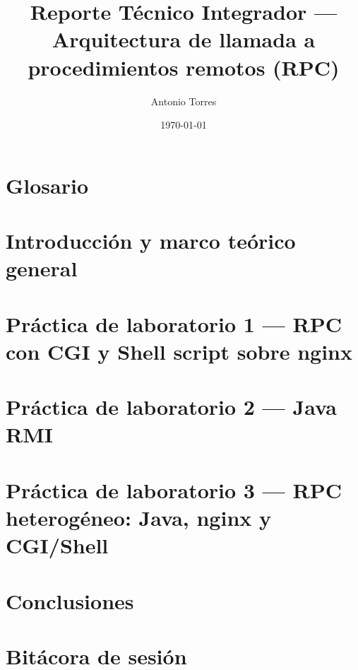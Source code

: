 \documentclass[12pt,letterpaper,oneside]{report}
\title{Reporte Técnico Integrador --- Arquitectura de llamada a procedimientos remotos (RPC)}
\author{Antonio Torres}
\date{\today}
\begin{document}


\clearpage

\tableofcontents
\clearpage
\listoffigures
\clearpage

\chapter*{Glosario}

\clearpage


\chapter{Introducción y marco teórico general}


\chapter{Práctica de laboratorio 1 --- RPC con CGI y Shell script sobre nginx}
\label{ch:practica1}




\chapter{Práctica de laboratorio 2 --- Java RMI}
\label{ch:practica2}




\chapter{Práctica de laboratorio 3 --- RPC heterogéneo: Java, nginx y CGI/Shell}
\label{ch:practica3}




\chapter{Conclusiones}


\clearpage
\printbibliography[heading=bibintoc,title={Referencias}]

\appendix
\chapter{Bitácora de sesión}

\end{document}

